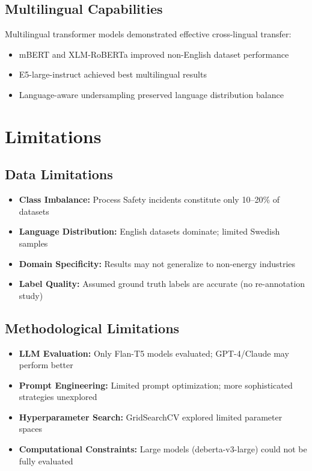 \documentclass[11pt, titlepage, bibliography=totoc]{scrreprt}
\begin{document}
\subsection{Multilingual Capabilities}
Multilingual transformer models demonstrated effective cross-lingual transfer:
\begin{itemize}
    \item mBERT and XLM-RoBERTa improved non-English dataset performance
    \item E5-large-instruct achieved best multilingual results
    \item Language-aware undersampling preserved language distribution balance
\end{itemize}

\section{Limitations}

\subsection{Data Limitations}
\begin{itemize}
    \item \textbf{Class Imbalance:} Process Safety incidents constitute only 10--20\% of datasets
    \item \textbf{Language Distribution:} English datasets dominate; limited Swedish samples
    \item \textbf{Domain Specificity:} Results may not generalize to non-energy industries
    \item \textbf{Label Quality:} Assumed ground truth labels are accurate (no re-annotation study)
\end{itemize}

\subsection{Methodological Limitations}
\begin{itemize}
    \item \textbf{LLM Evaluation:} Only Flan-T5 models evaluated; GPT-4/Claude may perform better
    \item \textbf{Prompt Engineering:} Limited prompt optimization; more sophisticated strategies unexplored
    \item \textbf{Hyperparameter Search:} GridSearchCV explored limited parameter spaces
    \item \textbf{Computational Constraints:} Large models (deberta-v3-large) could not be fully evaluated
\end{itemize}
\end{document}
